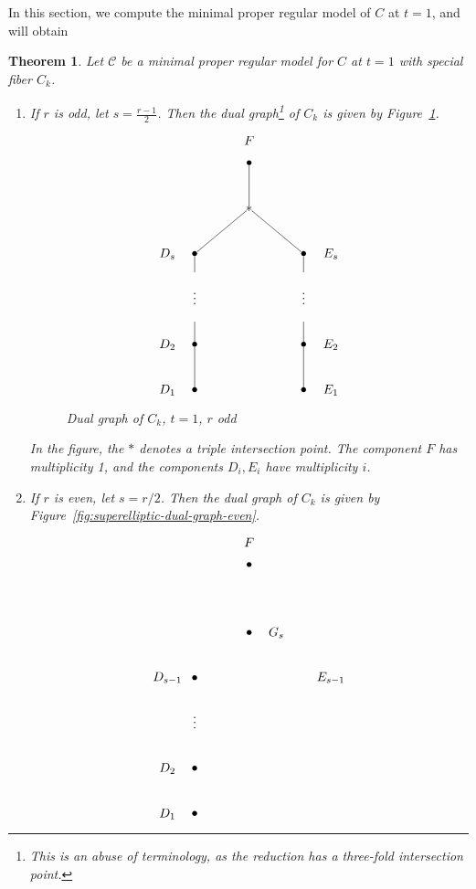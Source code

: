 \documentclass[reqno]{amsart}
\newtheorem{theorem}{Theorem}[section]
\theoremstyle{definition}
\theoremstyle{remark}
\def\scd{\mathscr{C}}
\begin{document}
In this section, we compute the minimal proper regular model of $C$ at $t = 1$, and will obtain
\begin{theorem}\label{thm:model-at-t-one}
  Let $\scd$ be a minimal proper regular model for $C$ at $t = 1$ with special fiber $C_k$.
  \begin{enumerate}
      \item If $r$ is odd, let $s = \frac{r-1}{2}$. Then the dual graph\footnote{This is an abuse of terminology, as the reduction has a three-fold intersection point.} of $C_k$ is given by Figure~\ref{fig:superelliptic-dual-graph-odd}.
\begin{figure}[h]\centering
  \[
\xygraph{
  !{<0cm,0cm>;<1.5cm,0cm>:<0cm,1.25cm>::}
  !{(2,5.5) }*{F}
  !{(2,5) }*{\bullet}="f"
  !{(2,4) }*{\ast}="triple"
  !{(.5,3) }*{D_{s}}
  !{(1,3) }*{\bullet}="ds"
  !{(1,2.6) }*{}="dabove"
  !{(1,2.1) }*{\vdots}="dspace"
  !{(1,1.5) }*{}="dbelow"
  !{(1,1) }*{\bullet}="d2"
  !{(.5,1) }*{D_2}
  !{(1,0) }*{\bullet}="d1"
  !{(.5,0) }*{D_1}
  !{(3.5,3) }*{E_{s}}
  !{(3,3) }*{\bullet}="es"
  !{(3,2.6) }*{}="eabove"
  !{(3,2.1) }*{\vdots}="espace"
  !{(3,1.5) }*{}="ebelow"
  !{(3,1) }*{\bullet}="e2"
  !{(3.5,1) }*{E_2}
  !{(3,0) }*{\bullet}="e1"
  !{(3.5,0) }*{E_1}
  "f"-"triple"
  "triple"-"ds"
  "ds"-"dabove"
  "dbelow"-"d2"
  "d2"-"d1"
  "triple"-"es"
  "es"-"eabove"
  "ebelow"-"e2"
  "e2"-"e1"
}
\]
  \caption{Dual graph of $C_k$, $t=1$, $r$ odd}
\label{fig:superelliptic-dual-graph-odd}
\end{figure}
In the figure, the $\ast$ denotes a triple intersection point. The component $F$ has multiplicity 1, and the components $D_i, E_i$ have multiplicity $i$.
  \item If $r$ is even, let $s = r/2$.  Then the dual graph of $C_k$ is given by Figure~\ref{fig:superelliptic-dual-graph-even}.
\begin{figure}[h]\centering
\[
\xygraph{
  !{<0cm,0cm>;<1.5cm,0cm>:<0cm,1.25cm>::}
  !{(2,6) }*{F}
  !{(2,5.5) }*{\bullet}="f"
  !{(2,4) }*{\bullet}="g"
  !{(2.5,4) }*{G_s}
  !{(.5,3) }*{D_{s-1}}
  !{(1,3) }*{\bullet}="ds"
  !{(1,2.6) }*{}="dabove"
  !{(1,2.1) }*{\vdots}="dspace"
  !{(1,1.5) }*{}="dbelow"
  !{(1,1) }*{\bullet}="d2"
  !{(.5,1) }*{D_2}
  !{(1,0) }*{\bullet}="d1"
  !{(.5,0) }*{D_1}
  !{(3.5,3) }*{E_{s-1}}
}\]
\end{figure}
\end{enumerate}
\end{theorem}
\end{document}
